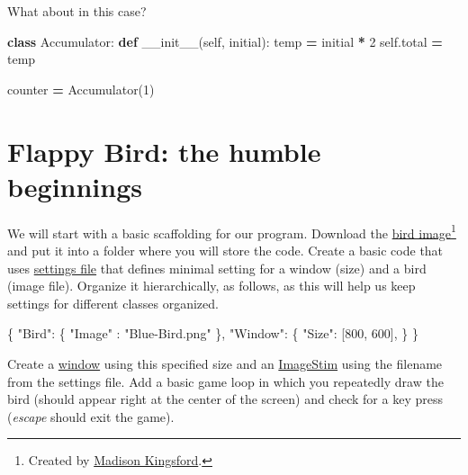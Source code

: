 \documentclass[
]{book}
\newenvironment{Shaded}{\begin{snugshade}}{\end{snugshade}}
\newcommand{\DataTypeTok}[1]{\textcolor[rgb]{0.13,0.29,0.53}{#1}}
\newcommand{\DecValTok}[1]{\textcolor[rgb]{0.00,0.00,0.81}{#1}}
\newcommand{\FunctionTok}[1]{\textcolor[rgb]{0.00,0.00,0.00}{#1}}
\newcommand{\KeywordTok}[1]{\textcolor[rgb]{0.13,0.29,0.53}{\textbf{#1}}}
\newcommand{\NormalTok}[1]{#1}
\newcommand{\OperatorTok}[1]{\textcolor[rgb]{0.81,0.36,0.00}{\textbf{#1}}}
\newcommand{\OtherTok}[1]{\textcolor[rgb]{0.56,0.35,0.01}{#1}}
\newcommand{\StringTok}[1]{\textcolor[rgb]{0.31,0.60,0.02}{#1}}
\newcommand{\VariableTok}[1]{\textcolor[rgb]{0.00,0.00,0.00}{#1}}
\begin{document}
What about in this case?

\begin{Shaded}
\begin{Highlighting}[]
\KeywordTok{class}\NormalTok{ Accumulator:}
    \KeywordTok{def} \FunctionTok{\_\_init\_\_}\NormalTok{(}\VariableTok{self}\NormalTok{, initial):}
\NormalTok{        temp }\OperatorTok{=}\NormalTok{ initial }\OperatorTok{*} \DecValTok{2}
        \VariableTok{self}\NormalTok{.total }\OperatorTok{=}\NormalTok{ temp}
        
\NormalTok{counter }\OperatorTok{=}\NormalTok{ Accumulator(}\DecValTok{1}\NormalTok{)}
\end{Highlighting}
\end{Shaded}

\hypertarget{flappy-bird-the-humble-beginnings}{%
\section{Flappy Bird: the humble beginnings}\label{flappy-bird-the-humble-beginnings}}

We will start with a basic scaffolding for our program. Download the \href{material/Blue-Bird.png}{bird image}\footnote{Created by \href{https://openclipart.org/artist/Scout}{Madison Kingsford}.} and put it into a folder where you will store the code. Create a basic code that uses \href{settings-files}{settings file} that defines minimal setting for a window (size) and a bird (image file). Organize it hierarchically, as follows, as this will help us keep settings for different classes organized.

\begin{Shaded}
\begin{Highlighting}[]
\FunctionTok{\{}
  \DataTypeTok{"Bird"}\FunctionTok{:} \FunctionTok{\{}
    \DataTypeTok{"Image"} \FunctionTok{:} \StringTok{"Blue{-}Bird.png"}
  \FunctionTok{\},}
  \DataTypeTok{"Window"}\FunctionTok{:} \FunctionTok{\{}
    \DataTypeTok{"Size"}\FunctionTok{:} \OtherTok{[}\DecValTok{800}\OtherTok{,} \DecValTok{600}\OtherTok{]}\FunctionTok{,}
  \FunctionTok{\}}
\FunctionTok{\}}
\end{Highlighting}
\end{Shaded}

Create a \href{https://psychopy.org/api/visual/window.html\#psychopy.visual.Window}{window} using this specified size and an \href{https://psychopy.org/api/visual/imagestim.html\#psychopy.visual.ImageStim}{ImageStim} using the filename from the settings file. Add a basic game loop in which you repeatedly draw the bird (should appear right at the center of the screen) and check for a key press (\emph{escape} should exit the game).
\end{document}
